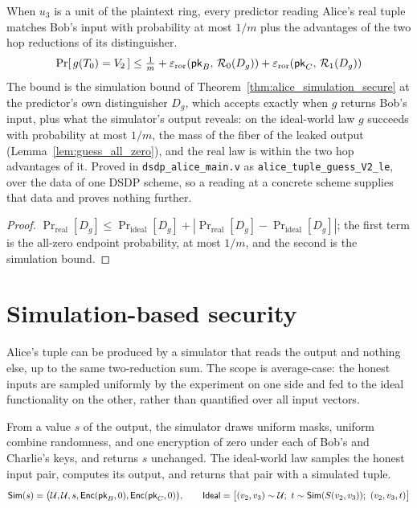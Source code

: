 \begin{theorem}
  \label{thm:alice_guess_real}
  \rocqok
  When $u_3$ is a unit of the plaintext ring, every predictor reading Alice's
  real tuple matches Bob's input with probability at most $1/m$ plus the
  advantages of the two hop reductions of its distinguisher.
  \[ \Pr[\,g(T_{0}) = V_2\,]
       \le \tfrac{1}{m} + \varepsilon_{\mathrm{ror}}(\mathsf{pk}_B,\,\mathcal{R}_{0}(D_g)) + \varepsilon_{\mathrm{ror}}(\mathsf{pk}_C,\,\mathcal{R}_{1}(D_g)) \]
  The bound is the simulation bound of
  Theorem~\ref{thm:alice_simulation_secure} at the predictor's own
  distinguisher $D_g$, which accepts exactly when $g$ returns Bob's input, plus
  what the simulator's output reveals: on the ideal-world law $g$ succeeds
  with probability at most $1/m$, the mass of the fiber of the leaked output
  (Lemma~\ref{lem:guess_all_zero}), and the real law is within the two hop
  advantages of it.
  Proved in \texttt{dsdp\_alice\_main.v} as
  \texttt{alice\_tuple\_guess\_V2\_le}, over the data of one DSDP scheme, so a
  reading at a concrete scheme supplies that data and proves nothing further.
\end{theorem}
\begin{proof}
  \rocqok
  $\Pr_{\mathrm{real}}[D_g] \le \Pr_{\mathrm{ideal}}[D_g]
   + |\Pr_{\mathrm{real}}[D_g] - \Pr_{\mathrm{ideal}}[D_g]|$; the first term
  is the all-zero endpoint probability, at most $1/m$, and the second is the
  simulation bound.
\end{proof}

\chapter{Simulation-based security}
\label{ch:simulation}

Alice's tuple can be produced by a simulator that reads the output and nothing
else, up to the same two-reduction sum. The scope is average-case: the honest
inputs are sampled uniformly by the experiment on one side and fed to the ideal
functionality on the other, rather than quantified over all input vectors.

\begin{definition}
  \label{def:alice_simulator}
  \rocqok
  From a value $s$ of the output, the simulator draws uniform masks, uniform
  combine randomness, and one encryption of zero under each of Bob's and
  Charlie's keys, and returns $s$ unchanged. The ideal-world law samples the
  honest input pair, computes its output, and returns that pair with a simulated
  tuple.
  \[ \mathsf{Sim}(s) = \big(\mathcal{U}, \mathcal{U}, s,
       \mathsf{Enc}(\mathsf{pk}_B, 0), \mathsf{Enc}(\mathsf{pk}_C, 0)\big),\qquad
     \mathsf{Ideal} = \big[(v_2,v_3) \sim \mathcal{U};\ t \sim \mathsf{Sim}(S(v_2,v_3));\
       (v_2, v_3, t)\big] \]
\end{definition}

